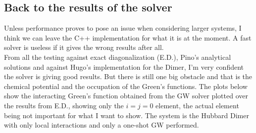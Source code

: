 \documentclass[12pt]{article}
\begin{document}
\subsection*{Back to the results of the solver}
Unless performance proves to pose an issue when considering larger systems, I think we can leave the C++ implementation for what it is at the moment. A fast solver is useless if it gives the wrong results after all.\\
From all the testing against exact diagonalization (E.D.), Pino's analytical solutions and against Hugo's implementation for the Dimer, I'm very confident the solver is giving good results. But there is still one big obstacle and that is the chemical potential and the occupation of the Green's functions. The plots below show the interacting Green's function obtained from the GW solver plotted over the results from E.D., showing only the $i=j=0$ element, the actual element being not important for what I want to show. The system is the Hubbard Dimer with only local interactions and only a one-shot GW performed.
\end{document}
